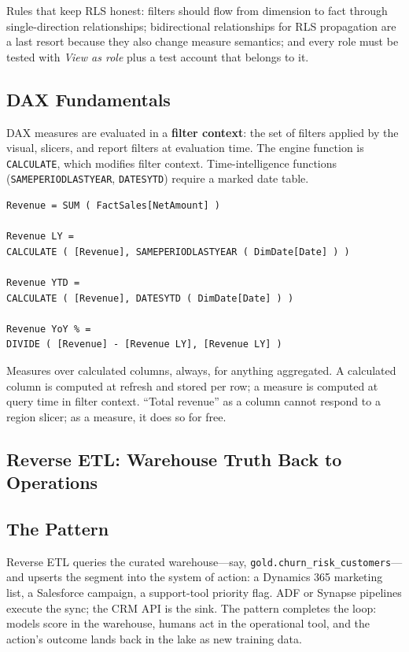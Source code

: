 Rules that keep RLS honest: filters should flow from dimension to fact through single-direction relationships; bidirectional relationships for RLS propagation are a last resort because they also change measure semantics; and every role must be tested with \emph{View as role} plus a test account that belongs to it.

\subsection{DAX Fundamentals}
DAX measures are evaluated in a \textbf{filter context}: the set of filters applied by the visual, slicers, and report filters at evaluation time. The engine function is \texttt{CALCULATE}, which modifies filter context. Time-intelligence functions (\texttt{SAMEPERIODLASTYEAR}, \texttt{DATESYTD}) require a marked date table.

\begin{lstlisting}[language={},caption={Core DAX measures for a sales model.},label={lst:ch16-dax}]
Revenue = SUM ( FactSales[NetAmount] )

Revenue LY =
CALCULATE ( [Revenue], SAMEPERIODLASTYEAR ( DimDate[Date] ) )

Revenue YTD =
CALCULATE ( [Revenue], DATESYTD ( DimDate[Date] ) )

Revenue YoY % =
DIVIDE ( [Revenue] - [Revenue LY], [Revenue LY] )
\end{lstlisting}

\begin{tipbox}
Measures over calculated columns, always, for anything aggregated. A calculated column is computed at refresh and stored per row; a measure is computed at query time in filter context. ``Total revenue'' as a column cannot respond to a region slicer; as a measure, it does so for free.
\end{tipbox}

\subsection{Reverse ETL: Warehouse Truth Back to Operations}

\subsection{The Pattern}
Reverse ETL queries the curated warehouse---say, \texttt{gold.churn\_risk\_customers}---and upserts the segment into the system of action: a Dynamics 365 marketing list, a Salesforce campaign, a support-tool priority flag. ADF or Synapse pipelines execute the sync; the CRM API is the sink. The pattern completes the loop: models score in the warehouse, humans act in the operational tool, and the action's outcome lands back in the lake as new training data.

